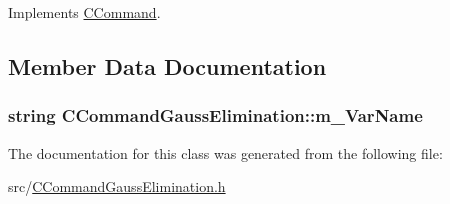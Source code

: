 Implements \hyperlink{classCCommand_ad9361ea814093c4ebecf22bb0a3f8b79}{C\+Command}.



\subsection{Member Data Documentation}
\subsubsection[{\texorpdfstring{m\+\_\+\+Var\+Name}{m_VarName}}]{\setlength{\rightskip}{0pt plus 5cm}string C\+Command\+Gauss\+Elimination\+::m\+\_\+\+Var\+Name\hspace{0.3cm}{\ttfamily [private]}}\hypertarget{classCCommandGaussElimination_a2e619e3d9fb79bca7076ab72c21c09b4}{}\label{classCCommandGaussElimination_a2e619e3d9fb79bca7076ab72c21c09b4}


The documentation for this class was generated from the following file\+:\begin{DoxyCompactItemize}
\item 
src/\hyperlink{CCommandGaussElimination_8h}{C\+Command\+Gauss\+Elimination.\+h}\end{DoxyCompactItemize}
